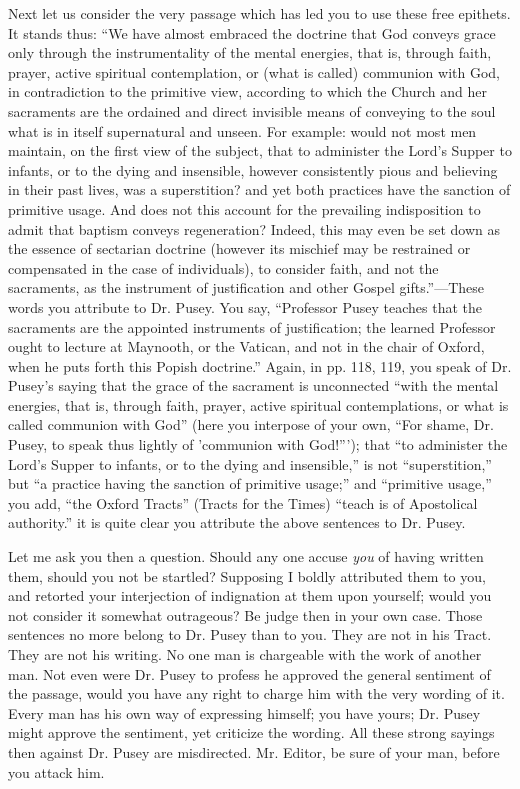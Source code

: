 Next let us consider the very passage which has
led you to use these free epithets. It stands thus: ``We have almost
embraced the doctrine that God conveys grace only through the
instrumentality of the mental energies, that is, through faith,
prayer, active spiritual contemplation, or (what is called) communion
with God, in contradiction to the primitive view, according to which
the Church and her sacraments are the ordained and direct invisible
means of conveying to the soul what is in itself supernatural and
unseen. For example: would not most men maintain, on the first view of
the subject, that to administer the Lord's Supper to infants, or to
the dying and insensible, however consistently pious and believing in
their past lives, was a superstition? and yet both practices have the
sanction of primitive usage. And does not this account for the
prevailing indisposition to admit that baptism conveys regeneration?
Indeed, this may even be set down as the essence of sectarian doctrine
(however its mischief may be restrained or compensated in the case of
individuals), to consider faith, and not the sacraments, as the
instrument of justification and other Gospel gifts.''—These words you
attribute to Dr. Pusey. You say, ``Professor Pusey teaches that the
sacraments are the appointed instruments of justification; the learned
Professor ought to lecture at Maynooth, or the Vatican, and not in the
chair of Oxford, when he puts forth this Popish doctrine.'' Again, in
pp. 118, 119, you speak of Dr. Pusey's saying that the grace of the
sacrament is unconnected ``with the mental energies, that is, through
faith, prayer, active spiritual contemplations, or what is called
communion with God'' (here you interpose of your own, ``For shame, Dr.
Pusey, to speak thus lightly of 'communion with God!'''); that ``to
administer the Lord's Supper to infants, or to the dying and
insensible,'' is not ``superstition,'' but ``a practice having the
sanction of primitive usage;'' and ``primitive usage,'' you add, ``the
Oxford Tracts'' (Tracts for the Times) ``teach is of Apostolical
authority.'' it is quite clear you attribute the above sentences to Dr.
Pusey.

Let me ask you then a question. Should any one
accuse \emph{you} of having written them, should you not be startled?
Supposing I boldly attributed them to you, and retorted your
interjection of indignation at them upon yourself; would you not
consider it somewhat outrageous? Be judge then in your own case. Those
sentences no more belong to Dr. Pusey than to you. They are not in his
Tract. They are not his writing. No one man is chargeable with the
work of another man. Not even were Dr. Pusey to profess he approved
the general sentiment of the passage, would you have any right to
charge him with the very wording of it. Every man has his own way of
expressing himself; you have yours; Dr. Pusey might approve the
sentiment, yet criticize the wording. All these strong sayings then
against Dr. Pusey are misdirected. Mr. Editor, be sure of your man,
before you attack him.

